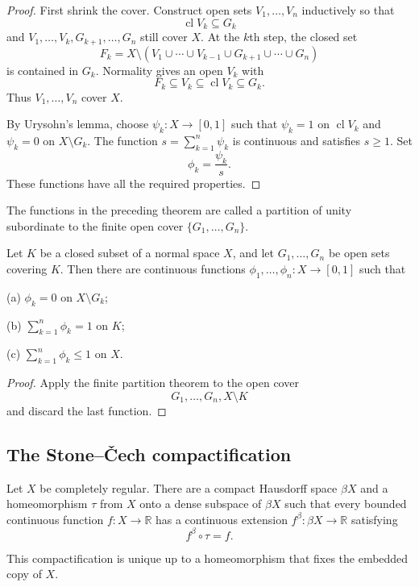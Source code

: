 \begin{proof}
First shrink the cover. Construct open sets $V_1,\ldots,V_n$ inductively so
that
\[
\operatorname{cl}V_k\subseteq G_k
\]
and $V_1,\ldots,V_k,G_{k+1},\ldots,G_n$ still cover $X$. At the $k$th step,
the closed set
\[
F_k=X\setminus
\left(V_1\cup\cdots\cup V_{k-1}\cup G_{k+1}\cup\cdots\cup G_n\right)
\]
is contained in $G_k$. Normality gives an open $V_k$ with
\[
F_k\subseteq V_k\subseteq\operatorname{cl}V_k\subseteq G_k.
\]
Thus $V_1,\ldots,V_n$ cover $X$.

By Urysohn's lemma, choose $\psi_k:X\to[0,1]$ such that
$\psi_k=1$ on $\operatorname{cl}V_k$ and $\psi_k=0$ on $X\setminus G_k$.
The function $s=\sum_{k=1}^n\psi_k$ is continuous and satisfies $s\geq1$.
Set
\[
\phi_k=\frac{\psi_k}{s}.
\]
These functions have all the required properties.
\end{proof}

The functions in the preceding theorem are called a partition of unity
subordinate to the finite open cover $\{G_1,\ldots,G_n\}$.

\begin{cor}
Let $K$ be a closed subset of a normal space $X$, and let
$G_1,\ldots,G_n$ be open sets covering $K$. Then there are continuous
functions $\phi_1,\ldots,\phi_n:X\to[0,1]$ such that

(a) $\phi_k=0$ on $X\setminus G_k$;

(b) $\sum_{k=1}^n\phi_k=1$ on $K$;

(c) $\sum_{k=1}^n\phi_k\leq1$ on $X$.
\end{cor}

\begin{proof}
Apply the finite partition theorem to the open cover
\[
G_1,\ldots,G_n,X\setminus K
\]
and discard the last function.
\end{proof}

\subsection{The Stone--\v{C}ech compactification}

\begin{thm}
Let $X$ be completely regular. There are a compact Hausdorff space $\beta X$
and a homeomorphism $\tau$ from $X$ onto a dense subspace of $\beta X$ such
that every bounded continuous function $f:X\to\mathbb{R}$ has a continuous
extension $f^\beta:\beta X\to\mathbb{R}$ satisfying
\[
f^\beta\circ\tau=f.
\]

This compactification is unique up to a homeomorphism that fixes the embedded
copy of $X$.
\end{thm}

